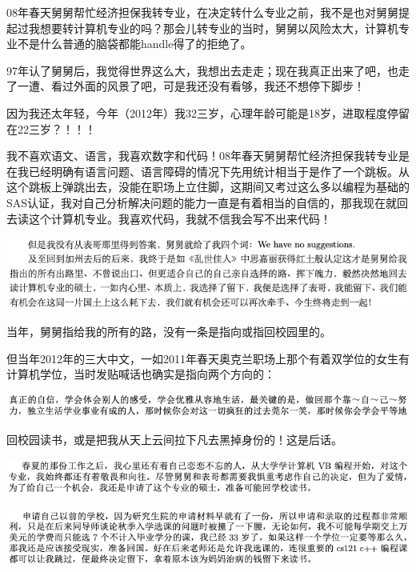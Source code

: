\documentclass[9pt, b5paper]{article}
\begin{document}
08年春天舅舅帮忙经济担保我转专业，在决定转什么专业之前，我不是也对舅舅提起过我想要转计算机专业的吗？那会儿转专业的当时，舅舅以风险太大，计算机专业不是什么普通的脑袋都能handle得了的拒绝了。

97年认了舅舅后，我觉得世界这么大，我想出去走走；现在我真正出来了吧，也走了一遭、看过外面的风景了吧，可是我还没有看够，我还不想停下脚步！

因为我还太年轻，今年（2012年）我32三岁，心理年龄可能是18岁，进取程度停留在22三岁？！！！

我不喜欢语文、语言，我喜欢数字和代码！08年春天舅舅帮忙经济担保我转专业是在我已经明确有语言问题、语言障碍的情况下先用统计相当于是作了一个跳板。从这个跳板上弹跳出去，没能在职场上立住脚，这期间又考过这么多以编程为基础的SAS认证，我对自己分析解决问题的能力一直是有着相当的自信的，那我现在就回去读这个计算机专业。我喜欢代码，我就不信我会写不出来代码！

\begin{center}
\includegraphics[width=.9\linewidth]{./pic/backups_plans_20210416_100815.png}
\end{center}

当年，舅舅指给我的所有的路，没有一条是指向或指回校园里的。

但当年2012年的三大中文，一如2011年春天奥克兰职场上那个有着双学位的女生有计算机学位，当时发贴喊话也确实是指向两个方向的：

\begin{center}
\includegraphics[width=.9\linewidth]{./pic/backups_plans_20210416_103455.png}
\end{center}

回校园读书，或是把我从天上云间拉下凡去黑掉身份的！这是后话。 

\begin{center}
\includegraphics[width=.9\linewidth]{./pic/backups_plans_20210414_161755.png}
\end{center}

\begin{center}
\includegraphics[width=.9\linewidth]{./pic/backups_plans_20210414_161857.png}
\end{center}
\end{document}
